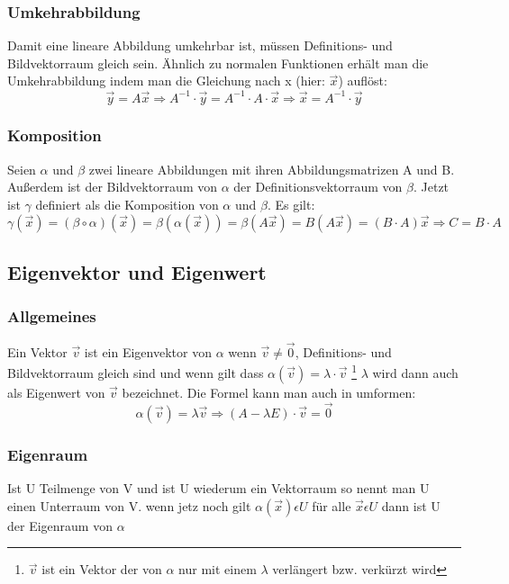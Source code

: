 \documentclass[a4paper,10pt]{scrartcl}
\begin{document}
            \subsubsection{Umkehrabbildung}
                Damit eine lineare Abbildung umkehrbar ist, müssen Definitions- und Bildvektorraum gleich sein. Ähnlich zu normalen Funktionen erhält man die Umkehrabbildung indem man die Gleichung
                nach x (hier: $\vec{x}$) auflöst: 
                \[
                    \vec{y} = A\vec{x} \Rightarrow A^{-1} \cdot \vec{y} = A^{-1} \cdot A \cdot \vec{x} \Rightarrow \vec{x} = A^{-1} \cdot \vec{y}    
                \]
            \subsubsection{Komposition}
                Seien $\alpha$ und $\beta$ zwei lineare Abbildungen mit ihren Abbildungsmatrizen A und B. Außerdem ist der Bildvektorraum von $\alpha$ der Definitionsvektorraum
                von $\beta$. Jetzt ist $\gamma$ definiert als die Komposition von $\alpha$ und $\beta$. Es gilt:
                \[
                    \gamma(\vec{x}) = (\beta \circ \alpha)(\vec{x}) = \beta(\alpha(\vec{x})) = \beta(A\vec{x}) = B(A\vec{x}) = (B \cdot A) \vec{x} \Rightarrow C = B \cdot A
                \]
            \newpage
            \subsection{Eigenvektor und Eigenwert}
                \subsubsection{Allgemeines}
                Ein Vektor $\vec{v}$ ist ein Eigenvektor von $\alpha$ wenn $\vec{v} \neq \vec{0}$, Definitions- und Bildvektorraum gleich sind und wenn gilt 
                dass $\alpha(\vec{v}) = \lambda \cdot \vec{v}$ \footnote{$\vec{v}$ ist ein Vektor der von $\alpha$ nur mit einem $\lambda$ verlängert bzw. verkürzt wird} 
                $\lambda$ wird dann auch als Eigenwert von $\vec{v}$ bezeichnet. Die Formel kann man auch in umformen:
                \[
                    \alpha(\vec{v}) = \lambda\vec{v} \Rightarrow (A - \lambda E) \cdot \vec{v} = \vec{0}   
                \]
                \subsubsection{Eigenraum}
                    Ist U Teilmenge von V und ist U wiederum ein Vektorraum so nennt man U einen Unterraum von V. wenn jetz noch gilt 
                    $\alpha(\vec{x}) \epsilon U$ für alle $\vec{x} \epsilon U$ dann ist U der Eigenraum von $\alpha$
\end{document}
